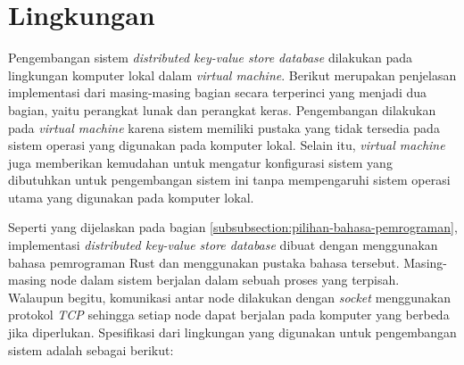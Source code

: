 \section{Lingkungan}
\label{sec:environment}

Pengembangan sistem \textit{distributed key-value store database} dilakukan pada lingkungan komputer lokal dalam \textit{virtual machine}. Berikut merupakan penjelasan implementasi dari masing-masing bagian secara terperinci yang menjadi dua bagian, yaitu perangkat lunak dan perangkat keras. Pengembangan dilakukan pada \textit{virtual machine} karena sistem memiliki pustaka yang tidak tersedia pada sistem operasi yang digunakan pada komputer lokal. Selain itu, \textit{virtual machine} juga memberikan kemudahan untuk mengatur konfigurasi sistem yang dibutuhkan untuk pengembangan sistem ini tanpa mempengaruhi sistem operasi utama yang digunakan pada komputer lokal.

Seperti yang dijelaskan pada bagian \ref{subsubsection:pilihan-bahasa-pemrograman}, implementasi \textit{distributed key-value store database} dibuat dengan menggunakan bahasa pemrograman Rust dan menggunakan pustaka bahasa tersebut. Masing-masing node dalam sistem berjalan dalam sebuah proses yang terpisah. Walaupun begitu, komunikasi antar node dilakukan dengan \textit{socket} menggunakan protokol \textit{TCP} sehingga setiap node dapat berjalan pada komputer yang berbeda jika diperlukan. Spesifikasi dari lingkungan yang digunakan untuk pengembangan sistem adalah sebagai berikut:

